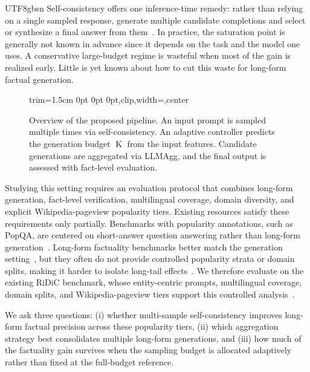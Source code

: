 \documentclass[11pt]{article}
\begin{document}
\begin{CJK*}{UTF8}{gbsn}
Self-consistency offers one inference-time remedy: rather than relying on a single sampled response, generate multiple candidate completions and select or synthesize a final answer from them~\citep{self-consistency,universal-self-consistency,thirukovalluru-etal-2024-atomic}. In practice, the saturation point is generally not known in advance since it depends on the task and the model one uses. A conservative large-budget regime is wasteful when most of the gain is realized early. Little is yet known about how to cut this waste for long-form factual generation.

\begin{figure}
  \centering
  \begin{adjustbox}{trim=1.5cm 0pt 0pt 0pt,clip,width=\textwidth,center}
    
  \end{adjustbox}
  \caption{Overview of the proposed pipeline. An input prompt is sampled multiple times via self-consistency. An adaptive controller predicts the generation budget $\operatorname{K}$ from the input features. Candidate generations are aggregated via LLMAgg, and the final output is assessed with fact-level evaluation.}
  \label{fig:pipeline}
\end{figure}

Studying this setting requires an evaluation protocol that combines long-form generation, fact-level verification, multilingual coverage, domain diversity, and explicit Wikipedia-pageview popularity tiers. Existing resources satisfy these requirements only partially. Benchmarks with popularity annotations, such as PopQA, are centered on short-answer question answering rather than long-form generation~\citep{popqa}. Long-form factuality benchmarks better match the generation setting~\citep{min-etal-2023-factscore, wildhallucinations}, but they often do not provide controlled popularity strata or domain splits, making it harder to isolate long-tail effects~\citep{wildhallucinations, DBLP:conf/nips/WeiYSLH0TPLHDL24, vazhentsev2026leveragingllmparametricknowledge}. We therefore evaluate on the existing RiDiC benchmark, whose entity-centric prompts, multilingual coverage, domain splits, and Wikipedia-pageview tiers support this controlled analysis~\citep{braslavski2026chroniclesridicgeneratingdatasets}.

We ask three questions: (i) whether multi-sample self-consistency improves long-form factual precision across these popularity tiers, (ii) which aggregation strategy best consolidates multiple long-form generations, and (iii) how much of the factuality gain survives when the sampling budget is allocated adaptively rather than fixed at the full-budget reference.


\end{CJK*}
\end{document}
